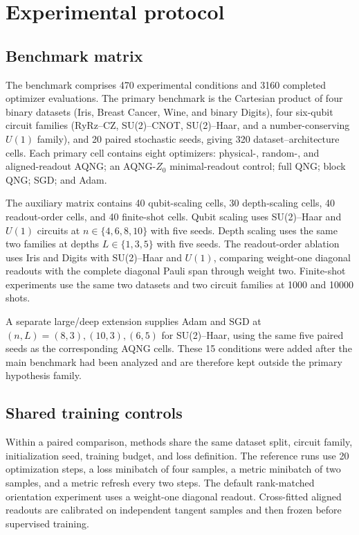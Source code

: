 \section{Experimental protocol}

\subsection{Benchmark matrix}
The benchmark comprises 470 experimental conditions and 3160 completed optimizer evaluations. The primary benchmark is the Cartesian product of four binary datasets (Iris, Breast Cancer, Wine, and binary Digits), four six-qubit circuit families (RyRz--CZ, SU(2)--CNOT, SU(2)--Haar, and a number-conserving $U(1)$ family), and 20 paired stochastic seeds, giving 320 dataset--architecture cells. Each primary cell contains eight optimizers: physical-, random-, and aligned-readout AQNG; an AQNG-$Z_0$ minimal-readout control; full QNG; block QNG; SGD; and Adam.

The auxiliary matrix contains 40 qubit-scaling cells, 30 depth-scaling cells, 40 readout-order cells, and 40 finite-shot cells. Qubit scaling uses SU(2)--Haar and $U(1)$ circuits at $n\in\{4,6,8,10\}$ with five seeds. Depth scaling uses the same two families at depths $L\in\{1,3,5\}$ with five seeds. The readout-order ablation uses Iris and Digits with SU(2)--Haar and $U(1)$, comparing weight-one diagonal readouts with the complete diagonal Pauli span through weight two. Finite-shot experiments use the same two datasets and two circuit families at 1000 and 10000 shots.

A separate large/deep extension supplies Adam and SGD at $(n,L)=(8,3),(10,3),(6,5)$ for SU(2)--Haar, using the same five paired seeds as the corresponding AQNG cells. These 15 conditions were added after the main benchmark had been analyzed and are therefore kept outside the primary hypothesis family.

\subsection{Shared training controls}
Within a paired comparison, methods share the same dataset split, circuit family, initialization seed, training budget, and loss definition. The reference runs use 20 optimization steps, a loss minibatch of four samples, a metric minibatch of two samples, and a metric refresh every two steps. The default rank-matched orientation experiment uses a weight-one diagonal readout. Cross-fitted aligned readouts are calibrated on independent tangent samples and then frozen before supervised training.

